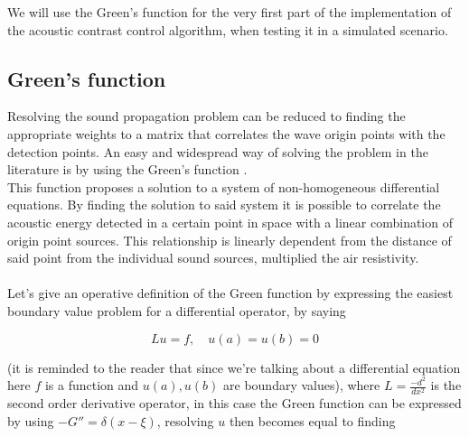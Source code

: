 We will use the Green's function for the very first part of the implementation of the acoustic contrast control algorithm, when testing it in a simulated scenario.

\subsection{Green's function}{}
\label{subsec:greenfct}

Resolving the sound propagation problem can be reduced to finding the appropriate weights to a matrix that correlates the wave origin points with the detection points. An easy and widespread way of solving the problem in the literature is by using the Green's function \parencite{elliott_robustness_2012,kuttruff_room_2014,shin_maximization_2010}.
\\
This function proposes a solution to a system of non-homogeneous differential equations. By finding the solution to said system it is possible to correlate the acoustic energy detected in a certain point in space with a linear combination of origin point sources. This relationship is linearly dependent from the distance of said point from the individual sound sources, multiplied the air resistivity.
\\
\\
Let's give an operative definition of the Green function by expressing the easiest boundary value problem for a differential operator, by saying

\[ L u = f,\quad u(a)=u(b)=0 \]

(it is reminded to the reader that since we're talking about a differential equation here $f$ is a function and $u(a), u(b)$ are boundary values), where $L = \frac{-d^2}{dx^2}$ is the second order derivative operator, in this case the Green function can be expressed by using $ - G'' = \delta (x - \xi)$, resolving $u$ then becomes equal to finding

